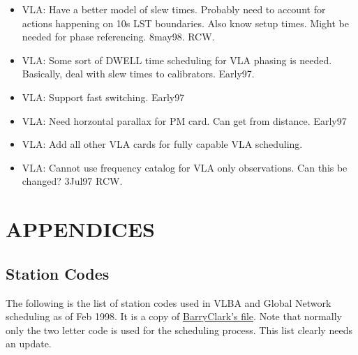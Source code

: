 \documentclass{report}
\begin{document}
\begin{itemize}
\item VLA:  Have a better model of slew times.  Probably need to account
      for actions happening on 10s LST boundaries.  Also know setup times.
      Might be needed for phase referencing.  8may98. RCW.

\item VLA:  Some sort of DWELL time scheduling for VLA phasing
      is needed.  Basically, deal with slew times to calibrators.  Early97.

\item VLA:  Support fast switching.  Early97

\item VLA:  Need horzontal parallax for PM card.  Can get from
      distance.  Early97

\item VLA:  Add all other VLA cards for fully capable VLA scheduling.

\item VLA:  Cannot use frequency catalog for VLA only observations.
      Can this be changed?  3Jul97 RCW.

\end{itemize}


\appendix

\chapter{\label{APP:APPENDICES}APPENDICES}


\section{\label{APP:STACODES}Station Codes}

The following is the list of station codes used in VLBA and Global
Network scheduling as of Feb 1998.  It is a copy of
{\href{http://www.aoc.nrao.edu/~bclark/stationcodes.html}{BarryClark's file}}.
Note that normally only the two letter code is used for the
scheduling process.  This list clearly needs an update.
\end{document}
